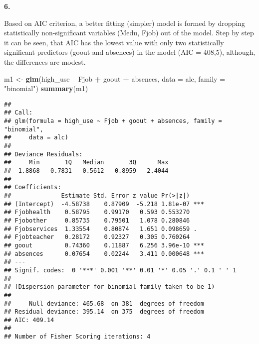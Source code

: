 \documentclass[]{article}
\newenvironment{Shaded}{\begin{snugshade}}{\end{snugshade}}
\newcommand{\DataTypeTok}[1]{\textcolor[rgb]{0.13,0.29,0.53}{#1}}
\newcommand{\KeywordTok}[1]{\textcolor[rgb]{0.13,0.29,0.53}{\textbf{#1}}}
\newcommand{\NormalTok}[1]{#1}
\newcommand{\OperatorTok}[1]{\textcolor[rgb]{0.81,0.36,0.00}{\textbf{#1}}}
\newcommand{\StringTok}[1]{\textcolor[rgb]{0.31,0.60,0.02}{#1}}
\begin{document}
\textbf{6.}

Based on AIC criterion, a better fitting (simpler) model is formed by
dropping statistically non-significant variables (Medu, Fjob) out of the
model. Step by step it can be seen, that AIC has the lowest value with
only two statistically significant predictors (goout and absences) in
the model (AIC = 408,5), although, the differences are modest.

\begin{Shaded}
\begin{Highlighting}[]
\NormalTok{m1 <-}\StringTok{ }\KeywordTok{glm}\NormalTok{(high_use }\OperatorTok{~}\StringTok{ }\NormalTok{Fjob }\OperatorTok{+}\StringTok{ }\NormalTok{goout }\OperatorTok{+}\StringTok{ }\NormalTok{absences, }\DataTypeTok{data =}\NormalTok{ alc, }\DataTypeTok{family =} \StringTok{"binomial"}\NormalTok{)}
\KeywordTok{summary}\NormalTok{(m1)}
\end{Highlighting}
\end{Shaded}

\begin{verbatim}
## 
## Call:
## glm(formula = high_use ~ Fjob + goout + absences, family = "binomial", 
##     data = alc)
## 
## Deviance Residuals: 
##     Min       1Q   Median       3Q      Max  
## -1.8868  -0.7831  -0.5612   0.8959   2.4044  
## 
## Coefficients:
##              Estimate Std. Error z value Pr(>|z|)    
## (Intercept)  -4.58738    0.87909  -5.218 1.81e-07 ***
## Fjobhealth    0.58795    0.99170   0.593 0.553270    
## Fjobother     0.85735    0.79501   1.078 0.280846    
## Fjobservices  1.33554    0.80874   1.651 0.098659 .  
## Fjobteacher   0.28172    0.92327   0.305 0.760264    
## goout         0.74360    0.11887   6.256 3.96e-10 ***
## absences      0.07654    0.02244   3.411 0.000648 ***
## ---
## Signif. codes:  0 '***' 0.001 '**' 0.01 '*' 0.05 '.' 0.1 ' ' 1
## 
## (Dispersion parameter for binomial family taken to be 1)
## 
##     Null deviance: 465.68  on 381  degrees of freedom
## Residual deviance: 395.14  on 375  degrees of freedom
## AIC: 409.14
## 
## Number of Fisher Scoring iterations: 4
\end{verbatim}

\begin{Shaded}
\end{Shaded}
\end{document}
